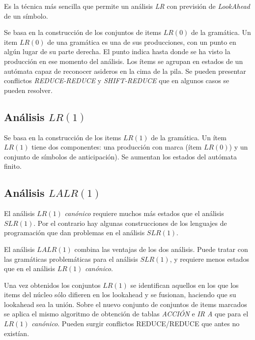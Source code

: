 Es la técnica más sencilla que permite un análisis \textit{LR} con previsión de \textit{LookAhead} de un símbolo.

Se basa en la construcción de los conjuntos de items $LR(0)$ de la gramática. Un item $LR(0)$ de una gramática es una de sus producciones, con un punto en algún lugar de su parte derecha. El punto indica hasta donde se ha visto la producción en ese momento del análisis. 
Los ítems se agrupan en estados de un autómata capaz de reconocer asideros en la cima de la pila.
Se pueden presentar conflictos \textit{REDUCE-REDUCE}  y \textit{SHIFT-REDUCE} que en algunos casos se pueden resolver. 


\subsection{Análisis $LR(1)$}

Se basa en la  construcción de los items $LR(1)$ de la gramática. Un ítem $LR(1)$ tiene dos componentes: una producción con marca (ítem $LR(0)$) y un conjunto de símbolos de anticipación).  Se aumentan los estados del autómata finito.





\subsection{Análisis $LALR(1)$}

El análisis $LR(1)$ \textit{canónico} requiere muchos más estados que el análisis $SLR(1)$. Por el contrario hay algunas construcciones de los lenguajes de programación que dan problemas en el análisis $SLR(1)$.

El análisis $LALR(1)$ combina las ventajas de los dos análisis. Puede tratar con las gramáticas problemáticas para el análisis $SLR(1)$, y requiere menos estados que en el análisis $LR(1)$ \textit{canónico}.

Una vez obtenidos los conjuntos $LR(1)$ se identifican aquellos en los que los items del núcleo sólo difieren en los lookahead y se fusionan, haciendo que su lookahead sea la unión.
Sobre el nuevo conjunto de conjuntos de items marcados se aplica el mismo algoritmo de obtención de tablas \textit{ACCIÓN} e \textit{IR A} que para el $LR(1)$ \textit{canónico}.
Pueden surgir conflictos REDUCE/REDUCE que antes no existían. 

